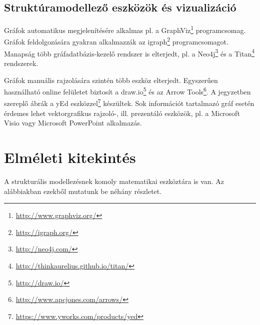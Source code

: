\subsection{Struktúramodellező eszközök és vizualizáció}
\label{sec:eszkozok}

Gráfok automatikus megjelenítésére alkalmas pl. a GraphViz\footnote{\url{http://www.graphviz.org/}} programcsomag. Gráfok feldolgozására gyakran alkalmazzák az igraph\footnote{\url{http://igraph.org/}} programcsomagot. Manapság több gráfadatbázis-kezelő rendszer is elterjedt, pl. a Neo4j\footnote{\url{http://neo4j.com/}} és a Titan\footnote{\url{http://thinkaurelius.github.io/titan/}} rendszerek.

Gráfok manuális rajzolására szintén több eszköz elterjedt. Egyszerűen használható online felületet biztosít a draw.io\footnote{\url{http://draw.io/}} és az Arrow Tools\footnote{\url{http://www.apcjones.com/arrows/}}. A jegyzetben szereplő ábrák a yEd eszközzel\footnote{\url{https://www.yworks.com/products/yed}} készültek. Sok információt tartalmazó gráf esetén érdemes lehet vektorgrafikus rajzoló-, ill. prezentáló eszközök, pl. a Microsoft Visio vagy Microsoft PowerPoint alkalmazás.


\section{Elméleti kitekintés\kieg}

A strukturális modellezésnek komoly matematikai eszköztára is van. Az alábbiakban ezekből mutatunk be néhány részletet.

%
%
%



